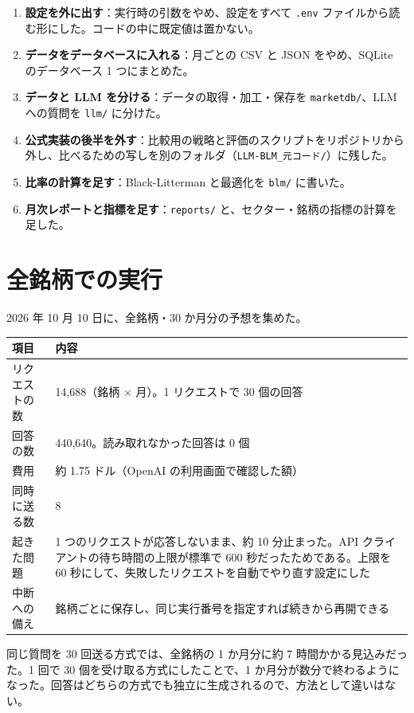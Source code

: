 \documentclass[xelatex,ja=standard,jafont=hiragino-pron,a4paper,10pt]{bxjsreport}
\newcommand{\code}[1]{\texttt{#1}}
\begin{document}
\begin{enumerate}
\item \textbf{設定を外に出す}：実行時の引数をやめ、設定をすべて \code{.env} ファイルから読む形にした。コードの中に既定値は置かない。
\item \textbf{データをデータベースに入れる}：月ごとの CSV と JSON をやめ、SQLite のデータベース 1 つにまとめた。
\item \textbf{データと LLM を分ける}：データの取得・加工・保存を \code{marketdb/}、LLM への質問を \code{llm/} に分けた。
\item \textbf{公式実装の後半を外す}：比較用の戦略と評価のスクリプトをリポジトリから外し、比べるための写しを別のフォルダ（\code{LLM-BLM\_元コード/}）に残した。
\item \textbf{比率の計算を足す}：Black-Litterman と最適化を \code{blm/} に書いた。
\item \textbf{月次レポートと指標を足す}：\code{reports/} と、セクター・銘柄の指標の計算を足した。
\end{enumerate}

\section{全銘柄での実行}

2026 年 10 月 10 日に、全銘柄・30 か月分の予想を集めた。

\begin{longtable}{p{4.20cm}p{10.20cm}}
\toprule
\textbf{項目} & \textbf{内容} \\
\midrule
\endfirsthead
\bottomrule
\endfoot
リクエストの数 & 14,688（銘柄 $\times$ 月）。1 リクエストで 30 個の回答 \\
回答の数 & 440,640。読み取れなかった回答は 0 個 \\
費用 & 約 1.75 ドル（OpenAI の利用画面で確認した額） \\
同時に送る数 & 8 \\
起きた問題 & 1 つのリクエストが応答しないまま、約 10 分止まった。API クライアントの待ち時間の上限が標準で 600 秒だったためである。上限を 60 秒にして、失敗したリクエストを自動でやり直す設定にした \\
中断への備え & 銘柄ごとに保存し、同じ実行番号を指定すれば続きから再開できる \\
\end{longtable}

同じ質問を 30 回送る方式では、全銘柄の 1 か月分に約 7 時間かかる見込みだった。1 回で 30 個を受け取る方式にしたことで、1 か月分が数分で終わるようになった。回答はどちらの方式でも独立に生成されるので、方法として違いはない。
\end{document}
